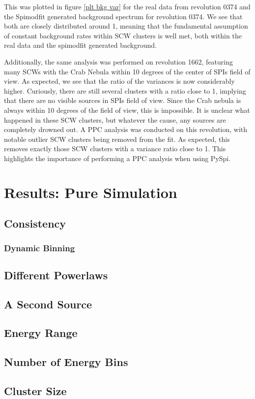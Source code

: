\documentclass{article}
\begin{document}
This was plotted in figure \ref{plt bkg var} for the real data from revolution 0374 and the Spimodfit generated background spectrum for revolution 0374. We see that both are closely distributed around 1, meaning that the fundamental assumption of constant background rates within SCW clusters is well met, both within the real data and the spimodfit generated background. 

Additionally, the same analysis was performed on revolution 1662, featuring many SCWs with the Crab Nebula within 10 degrees of the center of SPIs field of view. As expected, we see that the ratio of the variances is now considerably higher. Curiously, there are still several clusters with a ratio close to 1, implying that there are no visible sources in SPIs field of view. Since the Crab nebula is always within 10 degrees of the field of view, this is impossible. It is unclear what happened in these SCW clusters, but whatever the cause, any sources are completely drowned out. A PPC analysis was conducted on this revolution, with notable outlier SCW clusters being removed from the fit. As expected, this removes exactly those SCW clusters with a variance ratio close to 1. This highlights the importance of performing a PPC analysis when using PySpi.

\section{Results: Pure Simulation} \label{sec: pure sim}

\subsection{Consistency}

\subsubsection{Dynamic Binning}

\subsection{Different Powerlaws}

\subsection{A Second Source}

\subsection{Energy Range}

\subsection{Number of Energy Bins}

\subsection{Cluster Size}
\end{document}
